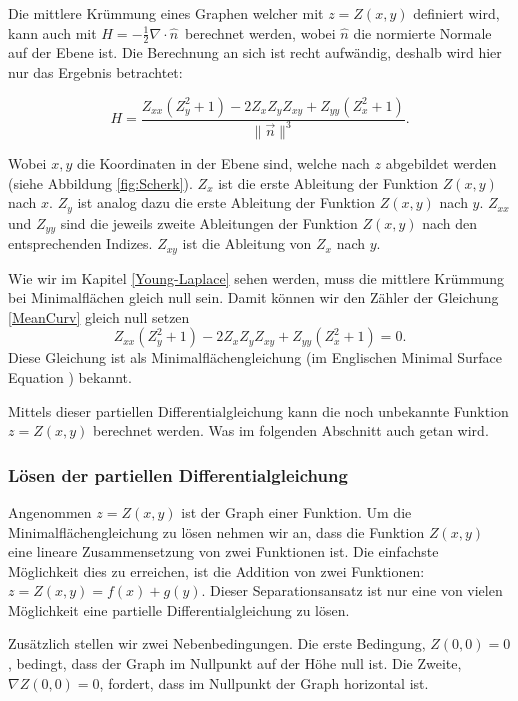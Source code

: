 \begin{refsection}
Die mittlere Krümmung eines Graphen welcher mit $z=Z(x,y)$ definiert wird, kann auch mit $H=-\frac{1}{2} \nabla \cdot \hat{n}$\, \cite{minimal:Spivak}  berechnet werden, wobei $\hat{n}$ die normierte Normale auf der Ebene ist. Die Berechnung an sich ist recht aufwändig, deshalb wird hier nur das Ergebnis betrachtet:

\begin{equation}\label{MeanCurv}
H=\frac{Z_{xx}(Z_y^2+1) - 2 Z_xZ_yZ_{xy}+Z_{yy}(Z_x^2+1)}{\|\vec{n}\|^3}.
\end{equation}

Wobei ${x,y}$ die Koordinaten in der Ebene sind, welche nach $z$ abgebildet werden (siehe Abbildung \ref{fig:Scherk}). $Z_x$ ist die erste Ableitung der Funktion $Z(x,y)$ nach $x$. $Z_y$ ist analog dazu die erste Ableitung der Funktion $Z(x,y)$ nach $y$. $Z_{xx}$ und $Z_{yy}$ sind die jeweils zweite Ableitungen der Funktion $Z(x,y)$ nach den entsprechenden Indizes. $Z_{xy}$ ist die Ableitung von $Z_x$ nach $y$.

Wie wir im Kapitel \ref{Young-Laplace} sehen werden, muss die mittlere Krümmung bei Minimalflächen gleich null sein. Damit können wir den Zähler der Gleichung \eqref{MeanCurv} gleich null setzen
\begin{equation}\label{MFG}
Z_{xx}(Z_y^2+1) - 2 Z_xZ_yZ_{xy}+Z_{yy}(Z_x^2+1)=0.
\end{equation}
Diese Gleichung ist als Minimalflächengleichung (im Englischen Minimal Surface Equation \cite{minimal:Osserman}) bekannt.

Mittels dieser partiellen Differentialgleichung kann die noch unbekannte Funktion $z=Z(x,y)$ berechnet werden. Was im folgenden Abschnitt auch getan wird.


\subsubsection{Lösen der partiellen Differentialgleichung}\label{Scherk Berechnung}
Angenommen $z=Z(x,y)$ ist der Graph einer Funktion. Um die Minimalflächengleichung zu lösen nehmen wir an, dass die Funktion $Z(x,y)$ eine lineare Zusammensetzung von zwei Funktionen ist. Die einfachste Möglichkeit dies zu erreichen, ist die Addition von zwei Funktionen: $z=Z(x,y)=f(x)+g(y)$. Dieser Separationsansatz ist nur eine von vielen Möglichkeit eine partielle Differentialgleichung zu lösen.

Zusätzlich stellen wir zwei Nebenbedingungen. Die erste Bedingung, $Z(0,0)=0$, bedingt, dass der Graph im Nullpunkt auf der Höhe null ist. Die Zweite, $\nabla Z(0,0)=0$, fordert, dass im Nullpunkt der Graph horizontal ist.


\end{refsection}
